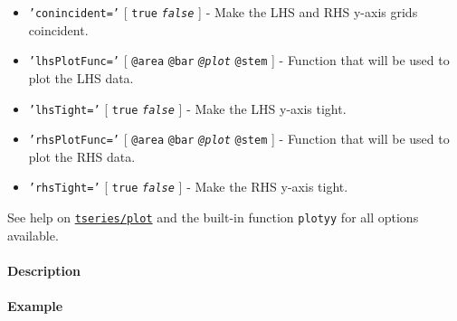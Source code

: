 \begin{itemize}
\item
  \texttt{'conincident='} {[} \texttt{true} \textbar{}
  \emph{\texttt{false}} {]} - Make the LHS and RHS y-axis grids
  coincident.
\item
  \texttt{'lhsPlotFunc='} {[} \texttt{@area} \textbar{} \texttt{@bar}
  \textbar{} \emph{\texttt{@plot}} \textbar{} \texttt{@stem} {]} -
  Function that will be used to plot the LHS data.
\item
  \texttt{'lhsTight='} {[} \texttt{true} \textbar{}
  \emph{\texttt{false}} {]} - Make the LHS y-axis tight.
\item
  \texttt{'rhsPlotFunc='} {[} \texttt{@area} \textbar{} \texttt{@bar}
  \textbar{} \emph{\texttt{@plot}} \textbar{} \texttt{@stem} {]} -
  Function that will be used to plot the RHS data.
\item
  \texttt{'rhsTight='} {[} \texttt{true} \textbar{}
  \emph{\texttt{false}} {]} - Make the RHS y-axis tight.
\end{itemize}

See help on \href{tseries/plot}{\texttt{tseries/plot}} and the built-in
function \texttt{plotyy} for all options available.

\paragraph{Description}\label{description}

\paragraph{Example}\label{example}


